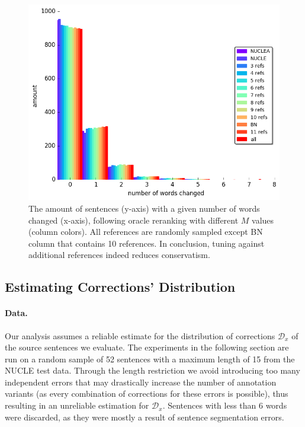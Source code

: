 \documentclass[letterpaper, 11pt]{article}
\begin{document}
\begin{figure}
	\vspace{-1em}
	\includegraphics[width=0.9\columnwidth]{words_differences_hist_reranking}
	\caption{The amount of sentences (y-axis) with a given number of words changed (x-axis), following oracle reranking with different $M$ values (column colors). All references are randomly sampled except BN column that contains  10 references.
		In conclusion, tuning against additional references indeed reduces conservatism.
		\label{fig:reranking_word_change}
        }
	\vspace{-0.5cm}
\end{figure}
%
\subsection{Estimating Corrections' Distribution}\label{subsec:corrections_distribution}
%
\paragraph{Data.}
Our analysis assumes a reliable estimate for the distribution of corrections
$\mathcal{D}_x$ of the source sentences we evaluate.
The experiments in the following section are run on a random sample of 52 sentences with a maximum length of 15 from the NUCLE test data.
Through the length restriction we avoid introducing too many independent errors that may drastically increase the number of annotation 
variants (as every combination of corrections for these errors is possible), thus resulting in an unreliable estimation for $\mathcal{D}_x$.
Sentences with less than 6 words were discarded, as they were mostly a result of sentence segmentation errors.
\end{document}
